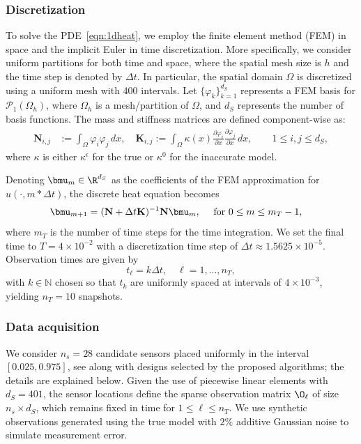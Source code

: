 \documentclass{aims} %
\theoremstyle{definition}
\begin{document}
\subsubsection*{Discretization}
To solve the PDE~\eqref{eqn:1dheat}, we employ the finite element method (FEM) in space and the implicit Euler in time discretization. 
%
More specifically, we consider uniform partitions for both time and space, where the spatial mesh size is $h$ and the time step is denoted by $\Delta t$. 
In particular, the spatial domain $\Omega$ is discretized using a uniform mesh with 400 intervals.
%
Let $\{ \varphi_k\}_{k =1}^{d_S}$ represents a FEM basis for $\mathcal{P}_1(\Omega_h)$, where $\Omega_h$ is a mesh/partition of $\Omega$,  and $d_S$ represents the number of basis functions. The mass and stiffness matrices  are defined component-wise as:
\begin{align*}
    \mathbf{N}_{i,j}&:=  \int_{\Omega} \varphi_i\varphi_j \,dx, \quad 
    \mathbf{K}_{i,j}:= \int_{\Omega}   \kappa(x) 
    \frac{\partial \varphi_i}{\partial x} 
    \frac{\partial \varphi_j}{\partial x}
    \,dx, \qquad 1 \leq i,j  \leq d_S,
\end{align*}
where $\kappa$ is either $\kappa^\epsilon$ for the true or $\kappa^0$ for the inaccurate model. 

Denoting $\bmu_m\in \R^{d_S}$ as the coefficients of the FEM approximation for $u(\cdot,m*\Delta t)$, the discrete heat equation becomes 
%
\begin{align}
    \bmu_{m+1} &= (\mathbf{N}+\Delta t \mathbf{K})^{-1} {\mathbf{N}}\bmu_m, \quad \mbox{ for }  0\le m \le m_T-1, \label{eq:evolution}
\end{align}
where 
$m_T$ is the number of time steps for the time integration.
%
We set the final time to $T = 4 \times 10^{-2}$ with a discretization time step of $\Delta t \approx 1.5625 \times 10^{-5}$. Observation times are given by 
\[
t_\ell = k \Delta t, \quad \ell = 1,\dots,n_T,
\]
with $k \in \mathbb{N}$ chosen so that $t_k$ are uniformly spaced at intervals of $4 \times 10^{-3}$, yielding $n_T = 10$ snapshots.



\subsubsection*{Data acquisition} 
%
We consider $n_s = 28$  candidate sensors placed uniformly in the interval $[0.025,0.975]$, see  along with designs selected by the proposed algorithms; the details are explained below. Given the use of piecewise linear elements with $d_S = 401$, the sensor locations define the sparse observation matrix \( \O_\ell \) of size \( n_s \times d_S \), which remains fixed in time for \( 1 \leq \ell \leq n_T \).  
% 
We use {synthetic observations} generated using the true model with $2\%$ additive Gaussian noise to simulate measurement error.
%
\end{document}
